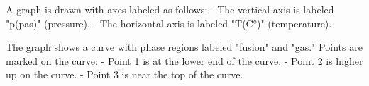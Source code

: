 A graph is drawn with axes labeled as follows:  
- The vertical axis is labeled "p(pas)" (pressure).  
- The horizontal axis is labeled "T(C°)" (temperature).  

The graph shows a curve with phase regions labeled "fusion" and "gas." Points are marked on the curve:  
- Point 1 is at the lower end of the curve.  
- Point 2 is higher up on the curve.  
- Point 3 is near the top of the curve.